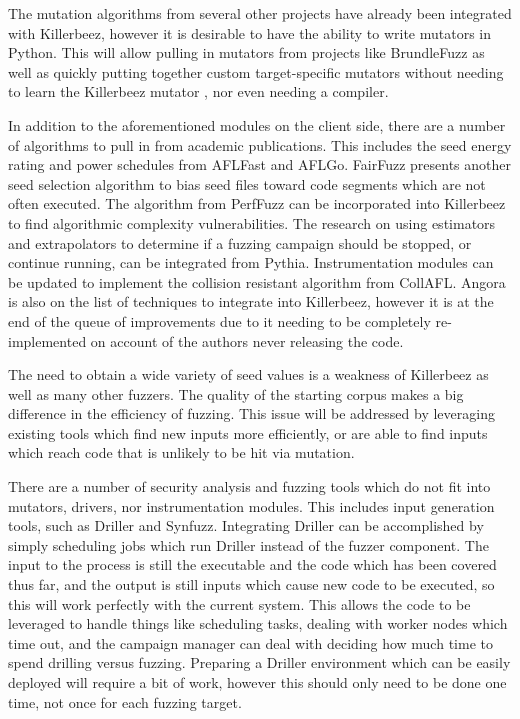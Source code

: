 The mutation algorithms from several other projects have already been
integrated with Killerbeez, however it is desirable to have the ability
to write mutators in Python.  This will allow pulling in mutators from
projects like BrundleFuzz\cite{brundlefuzz} as well as quickly putting
together custom target-specific mutators without needing to learn the Killerbeez
mutator \API{}, nor even needing a compiler.

In addition to the aforementioned modules on the client side, there are a number
of algorithms to pull in from academic publications.  This includes the seed
energy rating and power schedules from AFLFast\cite{aflfast} and
AFLGo.\cite{aflgo} FairFuzz presents another seed selection algorithm to bias
seed files toward code segments which are not often executed.\cite{fairfuzz}
The algorithm from PerfFuzz\cite{perffuzz} can be incorporated into
Killerbeez to find algorithmic complexity vulnerabilities. The research on
using estimators and extrapolators to determine if a fuzzing campaign should
be stopped, or continue running, can be integrated from Pythia.\cite{pythia}
Instrumentation modules can be updated to implement the collision resistant
algorithm from CollAFL.\cite{collafl} Angora is also on the list of techniques
to integrate into Killerbeez, however it is at the end of the queue of
improvements due to it needing to be completely re-implemented
on account of the authors never releasing the code.\cite{angora}

The need to obtain a wide variety of seed values is a weakness of Killerbeez
as well as many other fuzzers. The quality of the starting corpus makes a big
difference in the efficiency of fuzzing. This issue will be addressed by leveraging
existing tools which find new inputs more efficiently, or are able to find
inputs which reach code that is unlikely to be hit via mutation.

There are a number of security analysis and fuzzing tools which do not
fit into mutators, drivers, nor instrumentation modules. This includes input
generation tools, such as Driller\cite{driller} and Synfuzz\cite{synfuzz}.
Integrating Driller can be accomplished by simply scheduling \BOINC{} jobs
which run Driller instead of the fuzzer component. The input to the process
is still the executable and the code which has been covered thus far, and the
output is still inputs which cause new code to be executed, so this will work
perfectly with the current system.  This allows the \BOINC{} code to be
leveraged to handle things like scheduling tasks, dealing with worker nodes
which time out, and the campaign manager can deal with deciding how much time
to spend drilling versus fuzzing. Preparing a Driller environment which can
be easily deployed will require a bit of work, however this should only need
to be done one time, not once for each fuzzing target.

